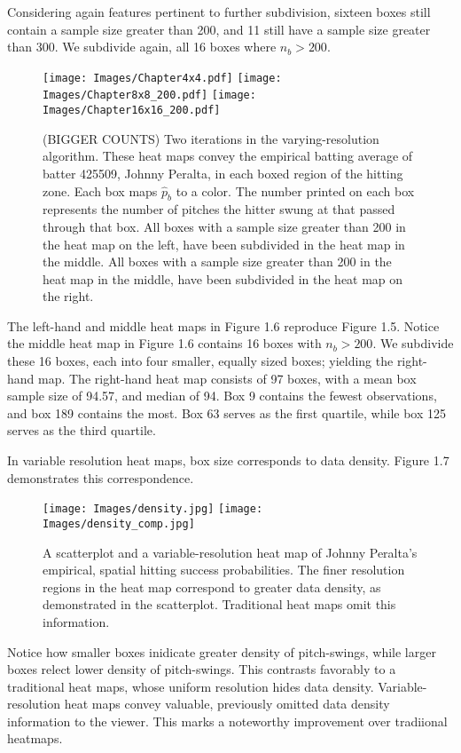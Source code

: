 Considering again features pertinent to further subdivision, sixteen boxes still contain a sample size greater than 200, and 11 still have a sample size greater than 300. We subdivide again, all 16 boxes where $n_{b} > 200$.
        \begin{figure}[H]
      	\centering
      	\texttt{[image: Images/Chapter4x4.pdf]}
      	\texttt{[image: Images/Chapter8x8\_200.pdf]} 
      	\texttt{[image: Images/Chapter16x16\_200.pdf]} 
      	\caption{(BIGGER COUNTS) Two iterations in the varying-resolution algorithm. These heat maps convey the empirical batting average of batter 425509, Johnny Peralta, in each boxed region of the hitting zone. Each box maps $\hat{p}_{b}$ to a color. The number printed on each box represents the number of pitches the hitter swung at that passed through that box. All boxes with a sample size greater than 200 in the heat map on the left, have been subdivided in the heat map in the middle. All boxes with a sample size greater than 200 in the heat map in the middle, have been subdivided in the heat map on the right.}
      	\end{figure}
The left-hand and middle heat maps in Figure 1.6 reproduce Figure 1.5. Notice the middle heat map in Figure 1.6 contains 16 boxes with $n_{b} > 200$. We subdivide these 16 boxes, each into four smaller, equally sized boxes; yielding the right-hand map. The right-hand heat map consists of 97 boxes, with a mean box sample size of 94.57, and median of 94. Box 9 contains the fewest observations, and box 189 contains the most. Box 63 serves as the first quartile, while box 125 serves as the third quartile. 

In variable resolution heat maps, box size corresponds to data density. Figure 1.7 demonstrates this correspondence. 
        \begin{figure}[H]
      	\centering
      	\texttt{[image: Images/density.jpg]}
      	\texttt{[image: Images/density\_comp.jpg]} 
      	\caption{A scatterplot and a variable-resolution heat map of Johnny Peralta's empirical, spatial hitting success probabilities. The finer resolution regions in the heat map correspond to greater data density, as demonstrated in the scatterplot. Traditional heat maps omit this information.}
      	\end{figure}
Notice how smaller boxes inidicate greater density of pitch-swings, while larger boxes relect lower density of pitch-swings. This contrasts favorably to a traditional heat maps, whose uniform resolution hides data density. Variable-resolution heat maps convey valuable, previously omitted data density information to the viewer. This marks a noteworthy improvement over tradiional heatmaps.

